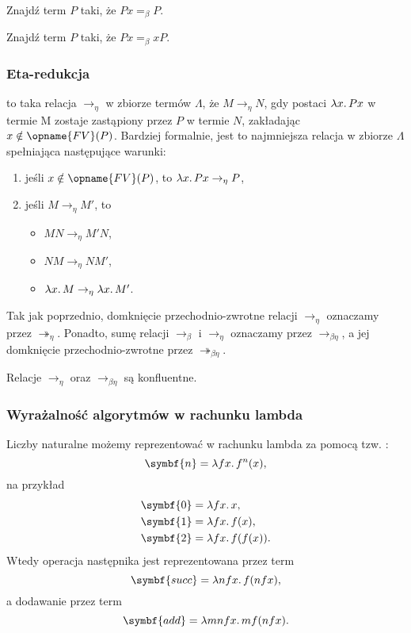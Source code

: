 \documentclass[polish,pretty]{angav}
\newcommand{\toto}{\twoheadrightarrow}
\newcommand{\FV}{\opname{FV}}
\begin{document}
\begin{problem}
    Znajdź term $P$ taki, że $Px =_\beta P$.
\end{problem}

\begin{problem}
    Znajdź term $P$ taki, że $Px =_\beta xP$.
\end{problem}

\subsubsection{Eta-redukcja}

 to taka relacja $\to_\eta$ w zbiorze termów $\Lambda$, że $M \to_\eta N$, gdy  postaci $\lambda x\ldotp Px$ w termie M zostaje zastąpiony przez $P$ w termie $N$, zakładając $x \notin \FV(P)$.
Bardziej formalnie, jest to najmniejsza relacja w zbiorze $\Lambda$ spełniająca następujące warunki:
\begin{enumerate}
    \item jeśli $x \notin \FV(P)$, to $\lambda x\ldotp Px \to_\eta P$,
    \item jeśli $M \to_\eta M'$, to
    \begin{itemize}[nosep]
        \item $MN \to_\eta M'N$,
        \item $NM \to_\eta NM'$,
        \item $\lambda x\ldotp M \to_\eta \lambda x\ldotp M'$.
    \end{itemize}
\end{enumerate}

Tak jak poprzednio, domknięcie przechodnio-zwrotne relacji $\to_\eta$ oznaczamy przez $\toto_\eta$. Ponadto, sumę relacji $\to_\beta$ i $\to_\eta$ oznaczamy przez $\to_{\beta\eta}$, a jej domknięcie przechodnio-zwrotne przez $\toto_{\beta\eta}$.

\begin{theorem}
    Relacje $\to_\eta$ oraz $\to_{\beta\eta}$ są konfluentne.
\end{theorem}

\subsubsection{Wyrażalność algorytmów w rachunku lambda}

Liczby naturalne możemy reprezentować w rachunku lambda za pomocą tzw. :
\[ \symbf{n} = \lambda fx\ldotp f^n(x), \]
na przykład
\begin{align*}
    \symbf{0} &= \lambda fx\ldotp x, \\
    \symbf{1} &= \lambda fx\ldotp f(x), \\
    \symbf{2} &= \lambda fx\ldotp f(f(x)).
\end{align*}
Wtedy operacja następnika jest reprezentowana przez term
\[ \symbf{succ} = \lambda nfx\ldotp f(nfx), \]
a dodawanie przez term
\[ \symbf{add} = \lambda mnfx\ldotp mf(nfx). \]
\end{document}
